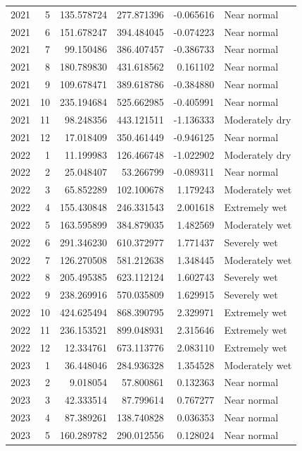 \begin{tabular}{rrrrrl}
2021 & 5 & 135.578724 & 277.871396 & -0.065616 & Near normal \\
2021 & 6 & 151.678247 & 394.484045 & -0.074223 & Near normal \\
2021 & 7 & 99.150486 & 386.407457 & -0.386733 & Near normal \\
2021 & 8 & 180.789830 & 431.618562 & 0.161102 & Near normal \\
2021 & 9 & 109.678471 & 389.618786 & -0.384880 & Near normal \\
2021 & 10 & 235.194684 & 525.662985 & -0.405991 & Near normal \\
2021 & 11 & 98.248356 & 443.121511 & -1.136333 & Moderately dry \\
2021 & 12 & 17.018409 & 350.461449 & -0.946125 & Near normal \\
2022 & 1 & 11.199983 & 126.466748 & -1.022902 & Moderately dry \\
2022 & 2 & 25.048407 & 53.266799 & -0.089311 & Near normal \\
2022 & 3 & 65.852289 & 102.100678 & 1.179243 & Moderately wet \\
2022 & 4 & 155.430848 & 246.331543 & 2.001618 & Extremely wet \\
2022 & 5 & 163.595899 & 384.879035 & 1.482569 & Moderately wet \\
2022 & 6 & 291.346230 & 610.372977 & 1.771437 & Severely wet \\
2022 & 7 & 126.270508 & 581.212638 & 1.348445 & Moderately wet \\
2022 & 8 & 205.495385 & 623.112124 & 1.602743 & Severely wet \\
2022 & 9 & 238.269916 & 570.035809 & 1.629915 & Severely wet \\
2022 & 10 & 424.625494 & 868.390795 & 2.329971 & Extremely wet \\
2022 & 11 & 236.153521 & 899.048931 & 2.315646 & Extremely wet \\
2022 & 12 & 12.334761 & 673.113776 & 2.083110 & Extremely wet \\
2023 & 1 & 36.448046 & 284.936328 & 1.354528 & Moderately wet \\
2023 & 2 & 9.018054 & 57.800861 & 0.132363 & Near normal \\
2023 & 3 & 42.333514 & 87.799614 & 0.767277 & Near normal \\
2023 & 4 & 87.389261 & 138.740828 & 0.036353 & Near normal \\
2023 & 5 & 160.289782 & 290.012556 & 0.128024 & Near normal \\

\end{tabular}
